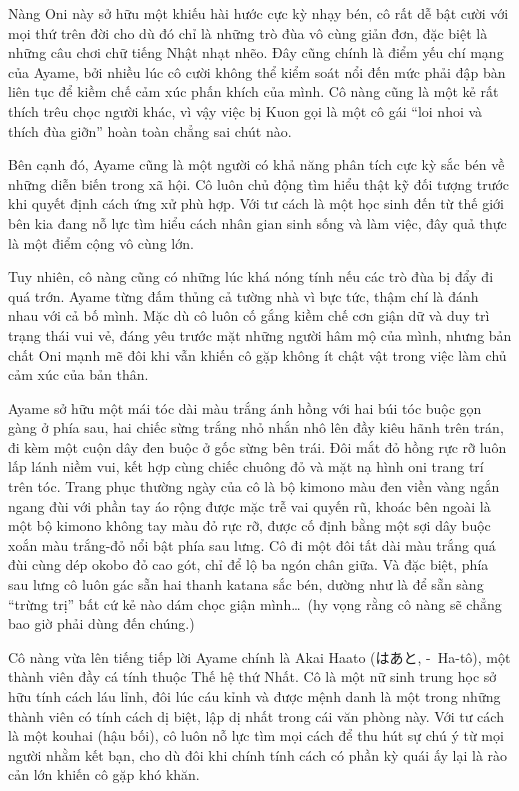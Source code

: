 \documentclass[../main.tex]{subfiles}
\begin{document}
Nàng Oni này sở hữu một khiếu hài hước cực kỳ nhạy bén, cô rất dễ bật cười với mọi thứ trên đời cho dù đó chỉ là những trò đùa vô cùng giản đơn, đặc biệt là những câu chơi chữ tiếng Nhật nhạt nhẽo. Đây cũng chính là điểm yếu chí mạng của Ayame, bởi nhiều lúc cô cười không thể kiểm soát nổi đến mức phải đập bàn liên tục để kiềm chế cảm xúc phấn khích của mình. Cô nàng cũng là một kẻ rất thích trêu chọc người khác, vì vậy việc bị Kuon gọi là một cô gái ``loi nhoi và thích đùa giỡn'' hoàn toàn chẳng sai chút nào.

Bên cạnh đó, Ayame cũng là một người có khả năng phân tích cực kỳ sắc bén về những diễn biến trong xã hội. Cô luôn chủ động tìm hiểu thật kỹ đối tượng trước khi quyết định cách ứng xử phù hợp. Với tư cách là một học sinh đến từ thế giới bên kia đang nỗ lực tìm hiểu cách nhân gian sinh sống và làm việc, đây quả thực là một điểm cộng vô cùng lớn.

Tuy nhiên, cô nàng cũng có những lúc khá nóng tính nếu các trò đùa bị đẩy đi quá trớn. Ayame từng đấm thủng cả tường nhà vì bực tức, thậm chí là đánh nhau với cả bố mình. Mặc dù cô luôn cố gắng kiềm chế cơn giận dữ và duy trì trạng thái vui vẻ, đáng yêu trước mặt những người hâm mộ của mình, nhưng bản chất Oni mạnh mẽ đôi khi vẫn khiến cô gặp không ít chật vật trong việc làm chủ cảm xúc của bản thân.

Ayame sở hữu một mái tóc dài màu trắng ánh hồng với hai búi tóc buộc gọn gàng ở phía sau, hai chiếc sừng trắng nhỏ nhắn nhô lên đầy kiêu hãnh trên trán, đi kèm một cuộn dây đen buộc ở gốc sừng bên trái. Đôi mắt đỏ hồng rực rỡ luôn lấp lánh niềm vui, kết hợp cùng chiếc chuông đỏ và mặt nạ hình oni trang trí trên tóc. Trang phục thường ngày của cô là bộ kimono màu đen viền vàng ngắn ngang đùi với phần tay áo rộng được mặc trễ vai quyến rũ, khoác bên ngoài là một bộ kimono không tay màu đỏ rực rỡ, được cố định bằng một sợi dây buộc xoắn màu trắng-đỏ nổi bật phía sau lưng. Cô đi một đôi tất dài màu trắng quá đùi cùng dép okobo đỏ cao gót, chỉ để lộ ba ngón chân giữa. Và đặc biệt, phía sau lưng cô luôn gác sẵn hai thanh katana sắc bén, dường như là để sẵn sàng ``trừng trị'' bất cứ kẻ nào dám chọc giận mình\dots\ (hy vọng rằng cô nàng sẽ chẳng bao giờ phải dùng đến chúng.)


Cô nàng vừa lên tiếng tiếp lời Ayame chính là Akai Haato (はあと, -\ Ha-tô), một thành viên đầy cá tính thuộc Thế hệ thứ Nhất. Cô là một nữ sinh trung học sở hữu tính cách láu lỉnh, đôi lúc cáu kỉnh và được mệnh danh là một trong những thành viên có tính cách dị biệt, lập dị nhất trong cái văn phòng này. Với tư cách là một kouhai (hậu bối), cô luôn nỗ lực tìm mọi cách để thu hút sự chú ý từ mọi người nhằm kết bạn, cho dù đôi khi chính tính cách có phần kỳ quái ấy lại là rào cản lớn khiến cô gặp khó khăn.
\end{document}
